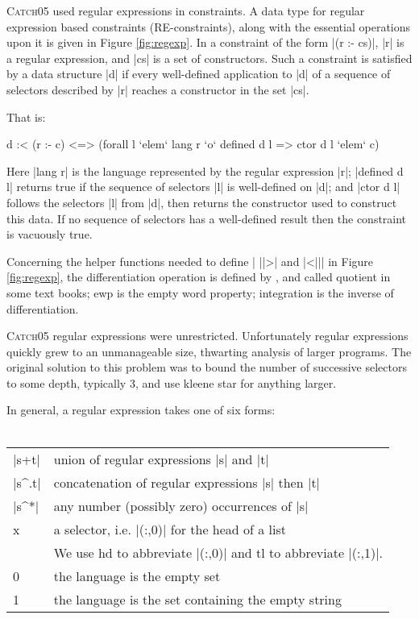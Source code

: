 \documentclass[preprint]{sigplanconf}
\newcommand{\C}[1]{\textsf{#1}}
\newcommand{\catch}{\textsc{Catch}}
\begin{document}
\catch05 used regular expressions in constraints. A data type for regular expression based constraints (RE-constraints), along with the essential operations upon it is given in Figure \ref{fig:regexp}. In a constraint of the form |(r :- cs)|, |r| is a regular expression, and |cs| is a set of constructors. Such a constraint is satisfied by a data structure |d| if every well-defined application to |d| of a sequence of selectors described by |r| reaches a constructor in the set |cs|.

That is:

\begin{code}
d :< (r :- c) <=> (forall l `elem` lang r `o` defined d l => ctor d l `elem` c)
\end{code}

Here |lang r| is the language represented by the regular expression |r|; |defined d l| returns true if the sequence of selectors |l| is well-defined on |d|; and |ctor d l| follows the selectors |l| from |d|, then returns the constructor used to construct this data. If no sequence of selectors has a well-defined result then the constraint is vacuously true.

Concerning the helper functions needed to define | ||>| and |<||| in Figure \ref{fig:regexp}, the differentiation operation is defined by \citet{conway:regexp}, and called quotient in some text books; \C{ewp} is the empty word property; integration is the inverse of differentiation.

\catch05 regular expressions were unrestricted. Unfortunately regular expressions quickly grew to an unmanageable size, thwarting analysis of larger programs. The original solution to this problem was to bound the number of successive selectors to some depth, typically 3, and use kleene star for anything larger.

In general, a regular expression takes one of six forms:\\ \\
\begin{tabular}{ll}
|s+t|  & union of regular expressions |s| and |t| \\
|s^.t| & concatenation of regular expressions |s| then |t| \\
|s^*|  & any number (possibly zero) occurrences of |s| \\
\C{x}  & a selector, i.e. |(:,0)| for the head of a list \\
       & We use \C{hd} to abbreviate |(:,0)| and \C{tl} to abbreviate |(:,1)|. \\
0      & the language is the empty set \\
1      & the language is the set containing the empty string
\end{tabular} \\
\end{document}
